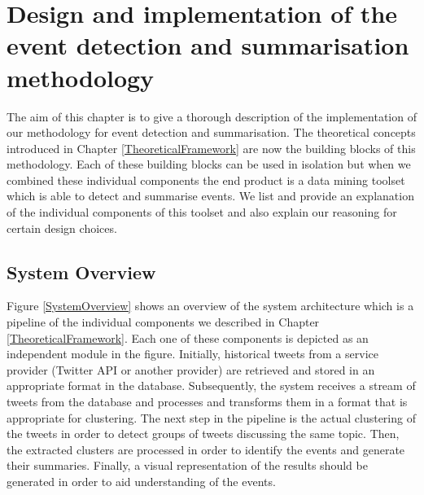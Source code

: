 \chapter{Design and implementation of the event detection and summarisation methodology}\label{DesignAndImplementation}
\ifpdf
    \graphicspath{{Chapter3/Chapter3Figs/PNG/}{Chapter3/Chapter3Figs/PDF/}{Chapter3/Chapter3Figs/}}
\else
    \graphicspath{{Chapter3/Chapter3Figs/EPS/}{Chapter3/Chapter3Figs/}}
\fi

The aim of this chapter is to give a thorough description of the implementation of our methodology for event detection and summarisation. The theoretical concepts introduced in Chapter \ref{TheoreticalFramework} are now the building blocks of this methodology. Each of these building blocks can be used in isolation but when we combined these individual components the end product is a data mining toolset which is able to detect and summarise events. We list and provide an explanation of the individual components of this toolset and also explain our reasoning for certain design choices. 

\section{System Overview}
Figure \ref{SystemOverview} shows an overview of the system architecture which is a pipeline of the individual components we described
in Chapter \ref{TheoreticalFramework}. Each one of these components is depicted as an independent module in the figure.  
Initially, historical tweets from a service provider (Twitter API or another provider) are retrieved and stored in an 
appropriate format in the database. Subsequently, the system receives a stream of tweets from the database and processes and 
transforms them in a format that is appropriate for clustering. The next step in the pipeline is the actual clustering of the tweets 
in order to detect groups of tweets discussing the same topic. Then, the extracted clusters are processed in order to identify the events 
and generate their summaries. Finally, a visual representation of the results should be generated in order to aid understanding of the events.\\

